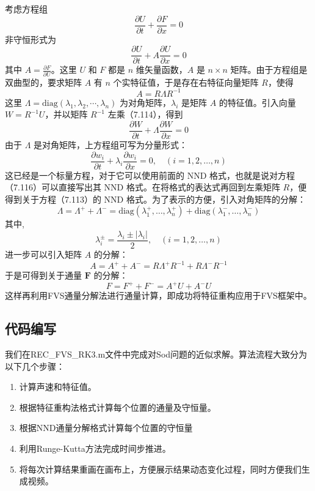 \documentclass[12pt,a4paper]{article}%
\begin{document}
		考虑方程组
		\[
		\frac{\partial U}{\partial t} + \frac{\partial F}{\partial x} = 0 
		\]
		非守恒形式为
		\[
		\frac{\partial U}{\partial t} + A \frac{\partial U}{\partial x} = 0
		\]
		其中 $A = \frac{\partial F}{\partial U}$。这里 $U$ 和 $F$ 都是 $n$ 维矢量函数，$A$ 是 $n \times n$ 矩阵。由于方程组是双曲型的，要求矩阵 $A$ 有 $n$ 个实特征值，于是存在右特征向量矩阵 $R$，使得
		\[
		A = R \Lambda R^{-1}
		\]
		这里 $\Lambda = \mathrm{diag}(\lambda_1, \lambda_2, \cdots, \lambda_n)$ 为对角矩阵，$\lambda_i$ 是矩阵 $A$ 的特征值。引入向量 $W = R^{-1} U$，并以矩阵 $R^{-1}$ 左乘（7.114），得到
		\[
		\frac{\partial W}{\partial t} + \Lambda \frac{\partial W}{\partial x} = 0
		\]
		由于 $\Lambda$ 是对角矩阵，上方程组可写为分量形式：
		\[
		\frac{\partial w_i}{\partial t} + \lambda_i \frac{\partial w_i}{\partial x} = 0, \quad (i = 1, 2, \ldots, n)
		\]
		这已经是一个标量方程，对于它可以使用前面的 NND 格式，也就是说对方程（7.116）可以直接写出其 NND 格式。在将格式的表达式再回到左乘矩阵 $R$，便得到关于方程（7.113）的 NND 格式。为了表示的方便，引入对角矩阵的分解：
		\[
		\Lambda = \Lambda^+ + \Lambda^- = \mathrm{diag}(\lambda_1^+, \ldots, \lambda_n^+) + \mathrm{diag}(\lambda_1^-, \ldots, \lambda_n^-)
		\]
		其中,
		\[
		\lambda_i^{\pm} = \frac{\lambda_i \pm |\lambda_i|}{2}, \quad (i = 1, 2, \ldots, n)
		\]
		进一步可以引入矩阵 $A$ 的分解：
		\[
		A = A^+ + A^- = R \Lambda^+ R^{-1} + R \Lambda^- R^{-1}
		\]
		于是可得到关于通量 $\mathbf{F}$ 的分解：
		\[
		F = F^+ + F^- = A^+ U + A^- U
		\]
		这样再利用FVS通量分解法进行通量计算，即成功将特征重构应用于FVS框架中。
		
		\subsection{代码编写}
		我们在REC\_FVS\_RK3.m文件中完成对Sod问题的近似求解。算法流程大致分为以下几个步骤：
		\begin{enumerate}
			\item 计算声速和特征值。
			\item 根据特征重构法格式计算每个位置的通量及守恒量。
			\item 根据NND通量分解格式计算每个位置的守恒量
			\item 利用Runge-Kutta方法完成时间步推进。
			\item 将每次计算结果重画在画布上，方便展示结果动态变化过程，同时方便我们生成视频。
		\end{enumerate}
		
\end{document}
